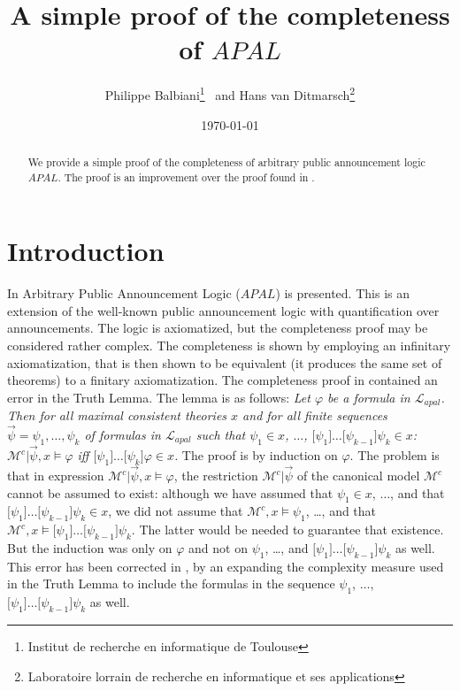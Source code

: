 \documentclass{article}[12pt]
\newcommand{\weg}[1]{}
\renewcommand{\phi}{\varphi}
\begin{document}
\title{A simple proof of the completeness of $APAL$}
\author{Philippe Balbiani\thanks{Institut de recherche en informatique de Toulouse} \ and Hans van Ditmarsch\thanks{Laboratoire lorrain de recherche en informatique et ses applications}}
\date{\today}
\maketitle
\begin{abstract}
We provide a simple proof of the completeness of arbitrary public announcement logic $APAL$. The proof is an improvement over the proof found in \cite{balbianietal:2008}.
\end{abstract}
\section{Introduction}
In \cite{balbianietal:2008} Arbitrary Public Announcement Logic ($APAL$) is presented. This is an extension of the well-known public announcement logic \cite{plaza:1989} with quantification over announcements. The logic is axiomatized, but the completeness proof may be considered rather complex. The completeness is shown by employing an infinitary axiomatization, that is then shown to be equivalent (it produces the same set of theorems) to a finitary axiomatization. The completeness proof in \cite{balbianietal:2008} contained an error in the Truth Lemma. The lemma is as follows: \weg{\begin{quote}} {\em Let $\varphi$ be a formula in ${\mathcal L}_{apal}$. Then for all maximal consistent theories
$x$ and for all finite sequences $\vec{\psi}=\psi_{1},\ldots,\psi_{k}$
of formulas in ${\mathcal L}_{apal}$ such that $\psi_{1}\in x$, $\ldots$, $
\lbrack\psi_{1}\rbrack\ldots\lbrack\psi_{k-1}\rbrack\psi_{k}\in x$:  ${\mathcal M}^{c}|{\vec{\psi}},x\models\varphi$ iff $\lbrack\psi_{1}\rbrack\ldots\lbrack\psi_{k}\rbrack\varphi\in x$.} \weg{\end{quote}} The proof is by induction on $\varphi$. The problem is that in expression ${\mathcal M}^{c}|{\vec{\psi}},x\models\varphi$, the restriction ${\mathcal M}^{c}|{\vec{\psi}}$
of the canonical model ${\mathcal M}^{c}$ cannot be assumed to exist: although we have assumed that
$\psi_{1} \in x$, $\ldots$, and that $\lbrack\psi_{1}\rbrack\ldots\lbrack
\psi_{k-1}\rbrack\psi_{k} \in x$, we did not assume that ${\mathcal M}^{c}, x \models \psi_{1}$, \dots, and that ${\mathcal M}^{c}, x \models \lbrack\psi_{1}\rbrack\ldots\lbrack\psi_{k-1}\rbrack\psi_{k}$. The latter would be needed to guarantee that existence. But the induction was only on $\phi$ and not on $\psi_{1}$, \dots, and $\lbrack\psi_{1}\rbrack\ldots\lbrack\psi_{k-1}\rbrack\psi_{k}$ as well. This error has been corrected in \cite{philippe.corrected:2014}, by an expanding the complexity measure used in the Truth Lemma to include the formulas in the sequence $\psi_{1}$, $\ldots$, $\lbrack\psi_{1}\rbrack\ldots\lbrack
\psi_{k-1}\rbrack\psi_{k}$ as well. 
\end{document}
